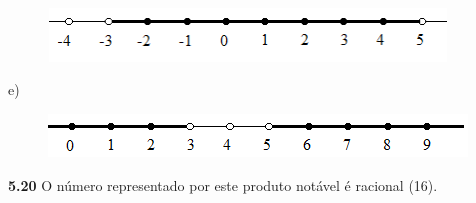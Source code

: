 \documentclass[12pt]{article}
\renewcommand{\_}{\kern-1.5pt\textunderscore\kern-1.5pt}
\begin{document}

\begin{figure}[H]
	\begin{Center}
		\includegraphics[width=4.17in,height=0.56in]{./media/image20.png}
	\end{Center}
\end{figure}



\par

\begin{adjustwidth}{0.3in}{0.0in}
 e)\par

\end{adjustwidth}




\begin{figure}[H]
	\begin{Center}
		\includegraphics[width=4.38in,height=0.45in]{./media/image21.png}
	\end{Center}
\end{figure}



\par


\vspace{\baselineskip}
\begin{adjustwidth}{0.29in}{0.0in}
\textbf{5.20} O número representado por este produto notável é racional (16).\par

\end{adjustwidth}


\vspace{\baselineskip}
\setlength{\parskip}{8.04pt}

\vspace{\baselineskip}

\vspace{\baselineskip}

\vspace{\baselineskip}

\vspace{\baselineskip}
\setlength{\parskip}{6.0pt}

\printbibliography
\end{document}

